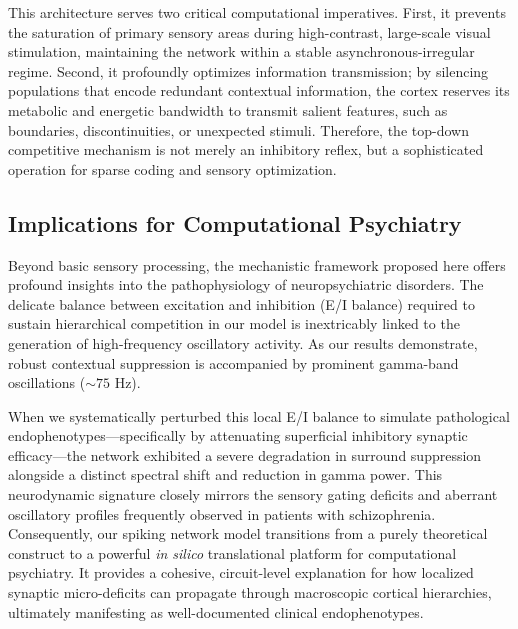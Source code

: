 This architecture serves two critical computational imperatives. First, it prevents the saturation of primary sensory areas during high-contrast, large-scale visual stimulation, maintaining the network within a stable asynchronous-irregular regime. Second, it profoundly optimizes information transmission; by silencing populations that encode redundant contextual information, the cortex reserves its metabolic and energetic bandwidth to transmit salient features, such as boundaries, discontinuities, or unexpected stimuli. Therefore, the top-down competitive mechanism is not merely an inhibitory reflex, but a sophisticated operation for sparse coding and sensory optimization.

\subsection{Implications for Computational Psychiatry}
Beyond basic sensory processing, the mechanistic framework proposed here offers profound insights into the pathophysiology of neuropsychiatric disorders. The delicate balance between excitation and inhibition (E/I balance) required to sustain hierarchical competition in our model is inextricably linked to the generation of high-frequency oscillatory activity. As our results demonstrate, robust contextual suppression is accompanied by prominent gamma-band oscillations ($\sim 75$ Hz). 

When we systematically perturbed this local E/I balance to simulate pathological endophenotypes—specifically by attenuating superficial inhibitory synaptic efficacy—the network exhibited a severe degradation in surround suppression alongside a distinct spectral shift and reduction in gamma power. This neurodynamic signature closely mirrors the sensory gating deficits and aberrant oscillatory profiles frequently observed in patients with schizophrenia. Consequently, our spiking network model transitions from a purely theoretical construct to a powerful \textit{in silico} translational platform for computational psychiatry. It provides a cohesive, circuit-level explanation for how localized synaptic micro-deficits can propagate through macroscopic cortical hierarchies, ultimately manifesting as well-documented clinical endophenotypes.


